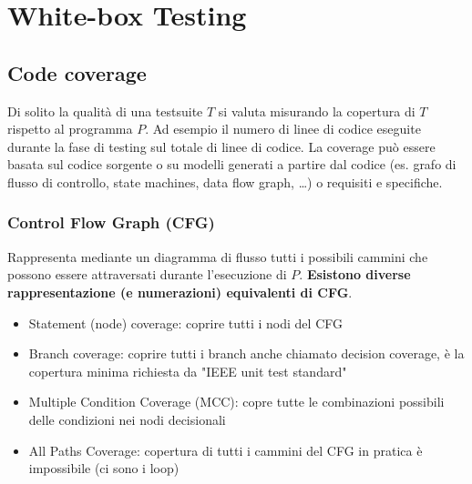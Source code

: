 \documentclass[12pt, a4paper]{report}
\begin{document}
\section{White-box Testing}
\subsection{Code coverage}
Di solito la qualità di una testsuite $T$ si valuta misurando la copertura di $T$ rispetto al programma $P$. Ad esempio il numero di linee di codice eseguite durante la fase di testing sul totale di linee di codice. La coverage può essere basata sul codice sorgente o su modelli generati a partire dal codice (es. grafo di flusso di controllo, state machines, data flow graph, \dots) o requisiti e specifiche.
\subsubsection{Control Flow Graph (CFG)}
Rappresenta mediante un diagramma di flusso tutti i possibili cammini che possono essere attraversati durante l'esecuzione di $P$. \textbf{Esistono diverse rappresentazione (e numerazioni) equivalenti di CFG}.
\begin{itemize}
    \item Statement (node) coverage: coprire tutti i nodi del CFG
    \item Branch coverage: coprire tutti i branch anche chiamato decision coverage, è la copertura minima richiesta da "IEEE unit test standard"
    \item Multiple Condition Coverage (MCC): copre tutte le combinazioni possibili delle condizioni nei nodi decisionali
    \item All Paths Coverage: copertura di tutti i cammini del CFG in pratica è impossibile (ci sono i loop)
\end{itemize}
\end{document}
